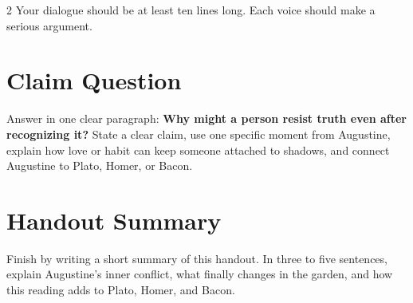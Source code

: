 \documentclass[12pt]{article}
\begin{document}
\begin{multicols}{2}
Your dialogue should be at least ten lines long. Each voice should make a serious argument.

\section*{Claim Question}
Answer in one clear paragraph: \textbf{Why might a person resist truth even after recognizing it?} State a clear claim, use one specific moment from Augustine, explain how love or habit can keep someone attached to shadows, and connect Augustine to Plato, Homer, or Bacon.

\section*{Handout Summary}
Finish by writing a short summary of this handout. In three to five sentences, explain Augustine's inner conflict, what finally changes in the garden, and how this reading adds to Plato, Homer, and Bacon.

\end{multicols}
\end{document}
